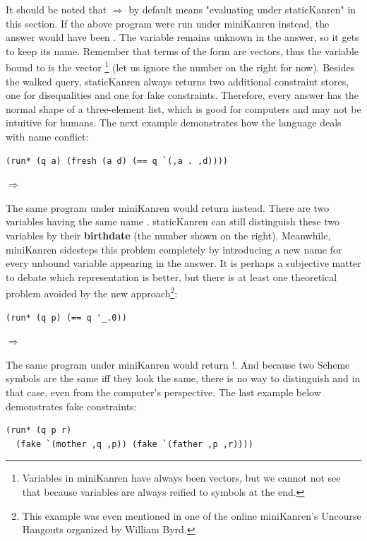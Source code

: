 It should be noted that $\Rightarrow$ by default means "evaluating under staticKanren" in this section. If the above program were run under miniKanren instead, the answer would have been . The variable  remains unknown in the answer, so it gets to keep its name. Remember that terms of the form  are vectors, thus the variable bound to  is the vector \footnote{Variables in miniKanren have always been vectors, but we cannot not see that because variables are always reified to symbols at the end.} (let us ignore the number on the right for now). Besides the walked query, staticKanren always returns two additional constraint stores, one for disequalities and one for fake constraints. Therefore, every answer has the normal shape of a three-element list, which is good for computers and may not be intuitive for humans. The next example demonstrates how the language deals with name conflict:

\begin{lstlisting}
(run* (q a) (fresh (a d) (== q `(,a . ,d))))
\end{lstlisting}
$\Rightarrow$ 

The same program under miniKanren would return  instead. There are two variables having the same name . staticKanren can still distinguish these two variables by their \textbf{birthdate} (the number shown on the right). Meanwhile, miniKanren sidesteps this problem completely by introducing a new name for every unbound variable appearing in the answer. It is perhaps a subjective matter to debate which representation is better, but there is at least one theoretical problem avoided by the new approach\footnote{This example was even mentioned in one of the online miniKanren's Uncourse Hangouts organized by William Byrd.}:

\begin{lstlisting}
(run* (q p) (== q '_.0))
\end{lstlisting}
$\Rightarrow$ 

The same program under miniKanren would return !. And because two Scheme symbols are the same iff they look the same, there is no way to distinguish  and  in that case, even from the computer's perspective. The last example below demonstrates fake constraints:
\begin{lstlisting}
(run* (q p r)
  (fake `(mother ,q ,p)) (fake `(father ,p ,r))))
\end{lstlisting}

